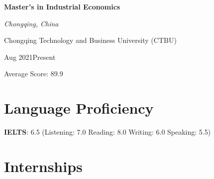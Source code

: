 \documentclass[a4paper,20pt]{article}
\begin{document}
    \begin{minipage}{.75\linewidth} \begin{flushleft}
\textbf{Master’s in Industrial Economics}
\end{flushleft} \end{minipage}
    \hfill 
    \begin{minipage}{.20\linewidth}\begin{flushright}
    	 \textit{Chongqing, China}
    	\end{flushright}\end{minipage}
    	
    	\begin{minipage}{.75\linewidth} \begin{flushleft}
     Chongqing Technology and Business University (CTBU)
     \\
    	\end{flushleft} \end{minipage}
         \hfill 
        \begin{minipage}{.20\linewidth}\begin{flushright}
        	 Aug 2021\textemdash Present
        	\end{flushright}\end{minipage}
        \begin{minipage}{.75\linewidth} \begin{flushleft}
    	    Average Score: 89.9 \\
    	\end{flushleft} 
     \end{minipage}

\section{Language Proficiency}
\textbf{IELTS}: 6.5 (Listening: 7.0 Reading: 8.0 Writing: 6.0 Speaking: 5.5) \\

\section{Internships}
\end{document}
